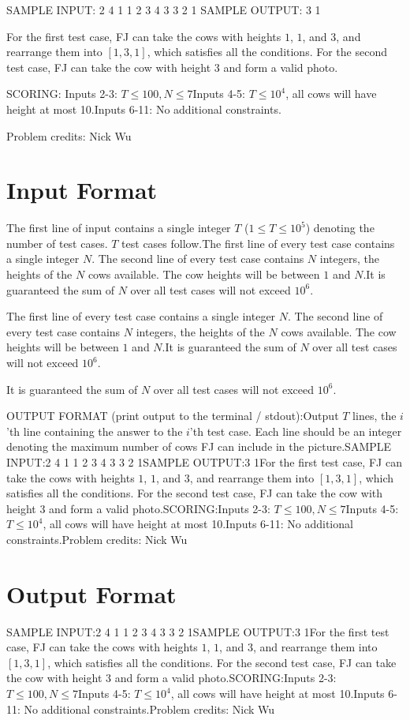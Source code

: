 \documentclass[12pt]{article}
\begin{document}
SAMPLE INPUT:
2
4
1 1 2 3
4
3 3 2 1
SAMPLE OUTPUT: 
3
1

For the first test case, FJ can take the cows with heights $1$, $1$, and $3$,
and rearrange them into $[1,3,1]$, which satisfies all the conditions. For the
second test case, FJ can take the cow with height $3$ and form a valid photo.

SCORING:
Inputs 2-3: $T\le 100, N \le 7$Inputs 4-5: $T \le 10^4$, all cows will have height at most 10.Inputs 6-11: No additional constraints.



Problem credits: Nick Wu



\section*{Input Format}
The first line of input contains a single integer $T$ ($1 \leq T \leq 10^5$)
denoting the number of test cases. $T$ test cases follow.The first line of every test case contains a single integer $N$. The second line
of every test case contains $N$ integers, the heights of the $N$ cows available.
The cow heights will be between $1$ and $N$.It is guaranteed the sum of $N$ over all test cases will not exceed $10^6$.

The first line of every test case contains a single integer $N$. The second line
of every test case contains $N$ integers, the heights of the $N$ cows available.
The cow heights will be between $1$ and $N$.It is guaranteed the sum of $N$ over all test cases will not exceed $10^6$.

It is guaranteed the sum of $N$ over all test cases will not exceed $10^6$.

OUTPUT FORMAT (print output to the terminal / stdout):Output $T$ lines, the $i$'th line containing the answer to the $i$'th test case.
Each line should be an integer denoting the maximum number of cows FJ can
include in the picture.SAMPLE INPUT:2
4
1 1 2 3
4
3 3 2 1SAMPLE OUTPUT:3
1For the first test case, FJ can take the cows with heights $1$, $1$, and $3$,
and rearrange them into $[1,3,1]$, which satisfies all the conditions. For the
second test case, FJ can take the cow with height $3$ and form a valid photo.SCORING:Inputs 2-3: $T\le 100, N \le 7$Inputs 4-5: $T \le 10^4$, all cows will have height at most 10.Inputs 6-11: No additional constraints.Problem credits: Nick Wu

\section*{Output Format}
SAMPLE INPUT:2
4
1 1 2 3
4
3 3 2 1SAMPLE OUTPUT:3
1For the first test case, FJ can take the cows with heights $1$, $1$, and $3$,
and rearrange them into $[1,3,1]$, which satisfies all the conditions. For the
second test case, FJ can take the cow with height $3$ and form a valid photo.SCORING:Inputs 2-3: $T\le 100, N \le 7$Inputs 4-5: $T \le 10^4$, all cows will have height at most 10.Inputs 6-11: No additional constraints.Problem credits: Nick Wu
\end{document}
